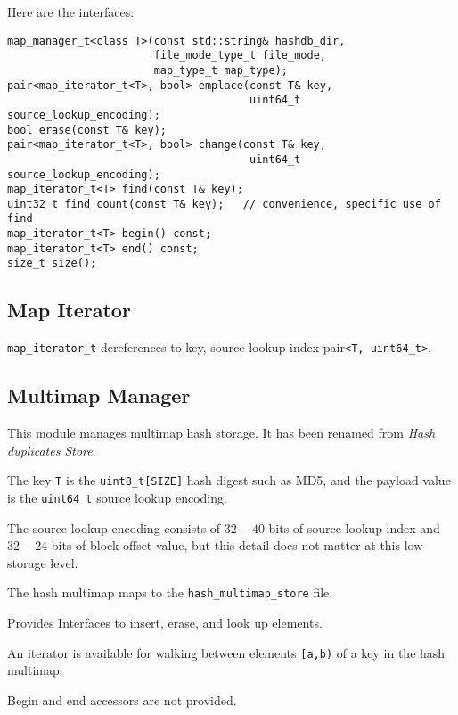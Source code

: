\documentclass[12pt,twoside]{article}
\begin{document}
Here are the interfaces:
\begin{small}
\begin{verbatim}
map_manager_t<class T>(const std::string& hashdb_dir,
                       file_mode_type_t file_mode,
                       map_type_t map_type);
pair<map_iterator_t<T>, bool> emplace(const T& key,
                                      uint64_t source_lookup_encoding);
bool erase(const T& key);
pair<map_iterator_t<T>, bool> change(const T& key,
                                      uint64_t source_lookup_encoding);
map_iterator_t<T> find(const T& key);
uint32_t find_count(const T& key);   // convenience, specific use of find
map_iterator_t<T> begin() const;
map_iterator_t<T> end() const;
size_t size();
\end{verbatim}
\end{small}

\subsection{Map Iterator}
\texttt{map\_iterator\_t} dereferences to
key, source lookup index pair\texttt{<T, uint64\_t>}.

\subsection{Multimap Manager}
This module manages multimap hash storage.
It has been renamed from \textit{Hash duplicates Store}.
\begin{compactitem}
\item The key \texttt{T} is the \texttt{uint8\_t[SIZE]} hash digest such as MD5,
and the payload value is the \texttt{uint64\_t} source lookup encoding.
\item The source lookup encoding consists of $32-40$ bits
of source lookup index and $32-24$ bits of block offset value,
but this detail does not matter at this low storage level.
\item The hash multimap maps to the \texttt{hash\_multimap\_store} file.
\item Provides Interfaces to insert, erase, and look up elements.
\item An iterator is available for walking
between elements \texttt{[a,b)} of a key in the hash multimap.
\item Begin and end accessors are not provided.
\end{compactitem}
\end{document}

